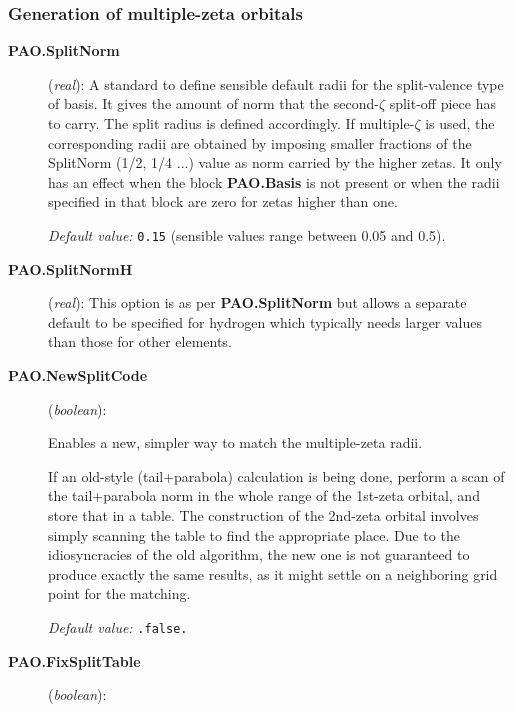 \documentclass[11pt]{article}
\begin{document}
\subsubsection{Generation of multiple-zeta orbitals}
\begin{description}

\item[{\bf PAO.SplitNorm}] ({\it real}):
A standard to define sensible default
radii for the split-valence type of basis. It gives the amount of norm that
the second-$\zeta$ split-off piece has to carry. The split radius is defined
accordingly. If multiple-$\zeta$
is used, the corresponding radii are obtained
by imposing smaller fractions of the SplitNorm (1/2, 1/4 ...) value as
norm carried by the higher zetas. It only has an effect when the block
{\bf PAO.Basis} is not present or when the radii
specified in that block are zero for zetas higher than one.

{\it Default value:} {\tt 0.15} (sensible values range between 0.05 and 0.5).

\item[{\bf PAO.SplitNormH}] ({\it real}):
This option is as per {\bf PAO.SplitNorm} but allows a separate
default to be
specified for hydrogen which typically needs larger values than those
for other
elements.

\item[{\bf PAO.NewSplitCode}] ({\it boolean}):

Enables a new, simpler way to match the multiple-zeta radii.

If an old-style (tail+parabola) calculation is being done, perform a
scan of the tail+parabola norm in the whole range of the 1st-zeta
orbital, and store that in a table. The construction of the
2nd-zeta orbital involves simply scanning the table to find the
appropriate place. Due to the idiosyncracies of the old algorithm,
the new one is not guaranteed to produce exactly the same results,
as it might settle on a neighboring grid point for the matching.

{\it Default value:} {\tt .false.}

\item[{\bf PAO.FixSplitTable}] ({\it boolean}):


\end{description}
\end{document}
